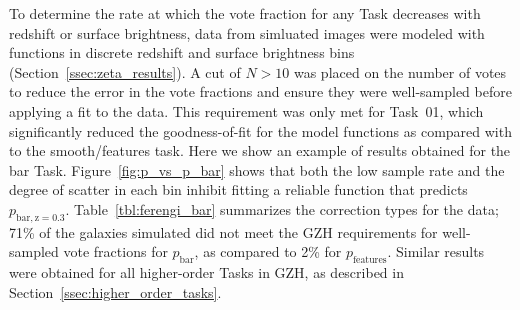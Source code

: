 \documentclass[twocolumn]{aastex6}
\begin{document}
To determine the rate at which the vote fraction for any Task decreases with redshift or surface brightness, data from simluated \ferengi{} images were modeled with functions in discrete redshift and surface brightness bins (Section~\ref{ssec:zeta_results}). A cut of $N>10$ was placed on the number of votes to reduce the error in the vote fractions and ensure they were well-sampled before applying a fit to the data. This requirement was only met for Task~01, which significantly reduced the goodness-of-fit for the model functions as compared with to the smooth/features task. Here we show an example of results obtained for the bar Task. Figure~\ref{fig:p_vs_p_bar} shows that both the low sample rate and the degree of scatter in each bin inhibit fitting a reliable function that predicts $p_\mathrm{bar,z=0.3}$. Table~\ref{tbl:ferengi_bar} summarizes the correction types for the \ferengi{} data; 71\% of the galaxies simulated did not meet the GZH requirements for well-sampled vote fractions for $p_\mathrm{bar}$, as compared to 2\% for $p_\mathrm{features}$. Similar results were obtained for all higher-order Tasks in GZH, as described in Section~\ref{ssec:higher_order_tasks}.  
\end{document}
